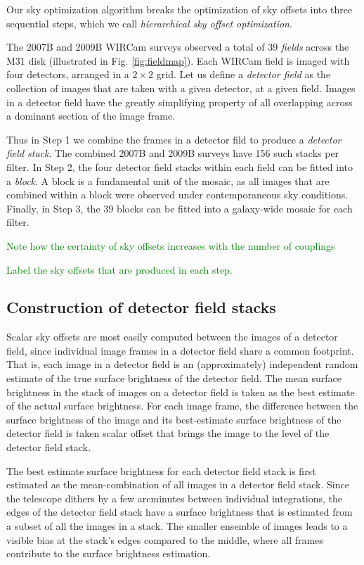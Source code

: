 \documentclass[iop]{emulateapj}
\newcommand{\todo}[1]{\textcolor{green}{#1}}
\begin{document}
Our sky optimization algorithm breaks the optimization of sky offsets into three sequential steps, which we call \emph{hierarchical sky offset optimization}.

The 2007B and 2009B WIRCam surveys observed a total of 39 \emph{fields} across the M31 disk (illustrated in Fig. \ref{fig:fieldmap}). Each WIRCam field is imaged with four detectors, arranged in a $2\times 2$ grid. Let us define a \emph{detector field} as the collection of images that are taken with a given detector, at a given field. Images in a detector field have the greatly simplifying property of all overlapping across a dominant section of the image frame.

Thus in Step 1 we combine the frames in a detector fild to produce a \emph{detector field stack}. The combined 2007B and 2009B surveys have 156 such stacks per filter. In Step 2, the four detector field stacks within each field can be fitted into a \emph{block}. A block is a fundamental unit of the mosaic, as all images that are combined within a block were observed under contemporaneous sky conditions. Finally, in Step 3, the 39 blocks can be fitted into a galaxy-wide mosaic for each filter.

\todo{Note how the certainty of sky offsets increases with the number of couplings}

\todo{Label the sky offsets that are produced in each step.}

\subsection{Construction of detector field stacks}
\label{sec:stacks}

Scalar sky offsets are most easily computed between the images of a detector field, since individual image frames in a detector field share a common footprint. That is, each image in a detector field is an (approximately) independent random estimate of the true surface brightness of the detector field. The mean surface brightness in the stack of images on a detector field is taken as the best estimate of the actual surface brightness. For each image frame, the difference between the surface brightness of the image and its best-estimate surface brightness of the detector field is taken scalar offset that brings the image to the level of the detector field stack.

The best estimate surface brightness for each detector field stack is first estimated as the mean-combination of all images in a detector field stack.  Since the telescope dithers by a few arcminutes between individual integrations, the edges of the detector field stack have a surface brightness that is estimated from a subset of all the images in a stack. The smaller ensemble of images leads to a visible bias at the stack's edges compared to the middle, where all frames contribute to the surface brightness estimation.
\end{document}
